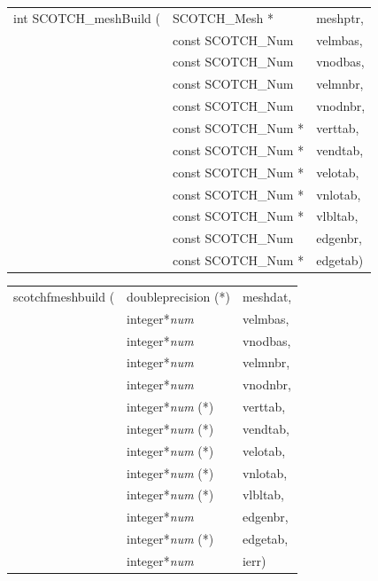 \begin{itemize}
\progsyn

{\tt\begin{tabular}{l@{}ll}
int SCOTCH\_meshBuild ( & SCOTCH\_Mesh *      & meshptr, \\
                        & const SCOTCH\_Num   & velmbas, \\
                        & const SCOTCH\_Num   & vnodbas, \\
                        & const SCOTCH\_Num   & velmnbr, \\
                        & const SCOTCH\_Num   & vnodnbr, \\
                        & const SCOTCH\_Num * & verttab, \\
                        & const SCOTCH\_Num * & vendtab, \\
                        & const SCOTCH\_Num * & velotab, \\
                        & const SCOTCH\_Num * & vnlotab, \\
                        & const SCOTCH\_Num * & vlbltab, \\
                        & const SCOTCH\_Num   & edgenbr, \\
                        & const SCOTCH\_Num * & edgetab)
\end{tabular}}

{\tt\begin{tabular}{l@{}ll}
scotchfmeshbuild ( & doubleprecision (*)   & meshdat, \\
                   & integer*{\it num}     & velmbas, \\
                   & integer*{\it num}     & vnodbas, \\
                   & integer*{\it num}     & velmnbr, \\
                   & integer*{\it num}     & vnodnbr, \\
                   & integer*{\it num} (*) & verttab, \\
                   & integer*{\it num} (*) & vendtab, \\
                   & integer*{\it num} (*) & velotab, \\
                   & integer*{\it num} (*) & vnlotab, \\
                   & integer*{\it num} (*) & vlbltab, \\
                   & integer*{\it num}     & edgenbr, \\
                   & integer*{\it num} (*) & edgetab, \\
                   & integer*{\it num}     & ierr)
\end{tabular}}


\end{itemize}
